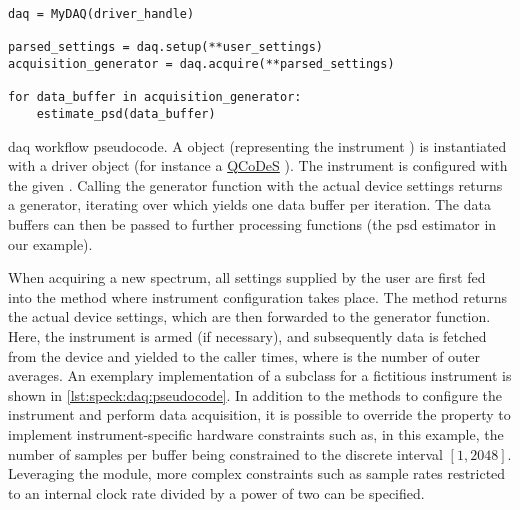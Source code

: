 \begin{listing}[htpb]
    \begin{verbatim}
daq = MyDAQ(driver_handle)

parsed_settings = daq.setup(**user_settings)
acquisition_generator = daq.acquire(**parsed_settings)

for data_buffer in acquisition_generator:
    estimate_psd(data_buffer)
    \end{verbatim}
    \caption[\gls{daq} workflow pseudocode]{
        \gls{daq} workflow pseudocode.
        A  object (representing the instrument ) is instantiated with a driver object (for instance a \href{https://github.com/microsoft/qcodes}{QCoDeS} ).
        The instrument is configured with the given .
        Calling the generator function  with the actual device settings returns a generator, iterating over which yields one data buffer per iteration.
        The data buffers can then be passed to further processing functions (the \gls{psd} estimator in our example).
    }
    \label{lst:speck:daq:workflow}
\end{listing}

When acquiring a new spectrum, all settings supplied by the user are first fed into the  method where instrument configuration takes place.
The method returns the actual device settings,
which are then forwarded to the  generator function.
Here, the instrument is armed (if necessary), and subsequently data is fetched from the device and yielded to the caller  times, where  is the number of outer averages.
An exemplary implementation of a  subclass for a fictitious instrument is shown in \cref{lst:speck:daq:pseudocode}.
In addition to the methods to configure the instrument and perform data acquisition, it is possible to override the  property to implement instrument-specific hardware constraints such as, in this example, the number of samples per buffer being constrained to the discrete interval $[1, 2048]$.
Leveraging the  module, more complex constraints such as sample rates restricted to an internal clock rate divided by a power of two
can be specified.

